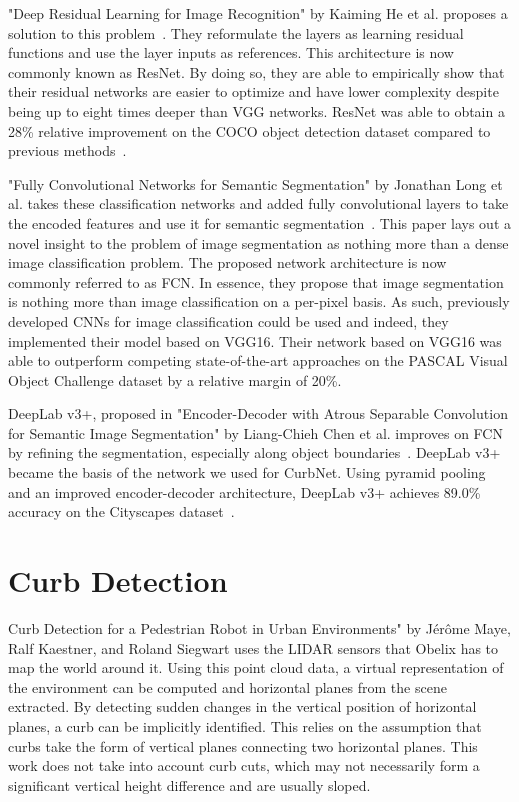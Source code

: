 "Deep Residual Learning for Image Recognition" by Kaiming He et al. proposes a solution to this problem~\cite{resnet}.
They reformulate the layers as learning residual functions and use the layer inputs as references.
This architecture is now commonly known as ResNet.
By doing so, they are able to empirically show that their residual networks are easier to optimize and have lower complexity despite being up to eight times deeper than VGG networks.
ResNet was able to obtain a 28\% relative improvement on the COCO object detection dataset compared to previous methods~\cite{coco}.

"Fully Convolutional Networks for Semantic Segmentation" by Jonathan Long et al. takes these classification networks and added fully convolutional layers to take the encoded features and use it for semantic segmentation~\cite{fcn}.
This paper lays out a novel insight to the problem of image segmentation as nothing more than a dense image classification problem.
The proposed network architecture is now commonly referred to as FCN.
In essence, they propose that image segmentation is nothing more than image classification on a per-pixel basis.
As such, previously developed CNNs for image classification could be used and indeed, they implemented their model based on VGG16.
Their network based on VGG16 was able to outperform competing state-of-the-art approaches on the PASCAL Visual Object Challenge dataset by a relative margin of 20\%.

DeepLab v3+, proposed in "Encoder-Decoder with Atrous Separable Convolution for Semantic Image Segmentation" by Liang-Chieh Chen et al. improves on FCN by refining the segmentation, especially along object boundaries~\cite{deeplab}.
DeepLab v3+ became the basis of the network we used for CurbNet.
Using pyramid pooling and an improved encoder-decoder architecture, DeepLab v3+ achieves 89.0\% accuracy on the Cityscapes dataset~\cite{cityscapes}.

\section{Curb Detection}\label{section:relatedwork-curbdetection}
Curb Detection for a Pedestrian Robot in Urban Environments" by Jérôme Maye, Ralf Kaestner, and Roland Siegwart uses the LIDAR sensors that Obelix has to map the world around it.
Using this point cloud data, a virtual representation of the environment can be computed and horizontal planes from the scene extracted.
By detecting sudden changes in the vertical position of horizontal planes, a curb can be implicitly identified.
This relies on the assumption that curbs take the form of vertical planes connecting two horizontal planes.
This work does not take into account curb cuts, which may not necessarily form a significant vertical height difference and are usually sloped.

